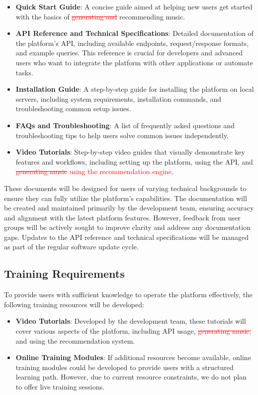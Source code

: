 \documentclass[12pt]{article}
\begin{document}
\begin{itemize}
  \item \textbf{Quick Start Guide}: A concise guide aimed at helping new users get started with the basics of \textcolor{red}{\sout{generating and }}recommending music.
  \item \textbf{API Reference and Technical Specifications}: Detailed documentation of the platform’s API, including available endpoints, request/response formats, and example queries. This reference is crucial for developers and advanced users who want to integrate the platform with other applications or automate tasks.
  \item \textbf{Installation Guide}: A step-by-step guide for installing the platform on local servers, including system requirements, installation commands, and troubleshooting common setup issues.
  \item \textbf{FAQs and Troubleshooting}: A list of frequently asked questions and troubleshooting tips to help users solve common issues independently.
  \item \textbf{Video Tutorials}: Step-by-step video guides that visually demonstrate key features and workflows, including setting up the platform, using the API, and \textcolor{red}{\sout{generating music}} \textcolor{red}{using the recommendation engine}.
\end{itemize}

These documents will be designed for users of varying technical backgrounds to ensure they can fully utilize the platform's capabilities. The documentation will be created and maintained primarily by the development team, ensuring accuracy and alignment with the latest platform features. However, feedback from user groups will be actively sought to improve clarity and address any documentation gaps. Updates to the API reference and technical specifications will be managed as part of the regular software update cycle.

\subsection{Training Requirements}

To provide users with sufficient knowledge to operate the platform effectively, the following training resources will be developed:

\begin{itemize}
  \item \textbf{Video Tutorials}: Developed by the development team, these tutorials will cover various aspects of the platform, including API usage, \textcolor{red}{\sout{generating music,}} and using the recommendation system.
  \item \textbf{Online Training Modules}: If additional resources become available, online training modules could be developed to provide users with a structured learning path. However, due to current resource constraints, we do not plan to offer live training sessions.
\end{itemize}
\end{document}
